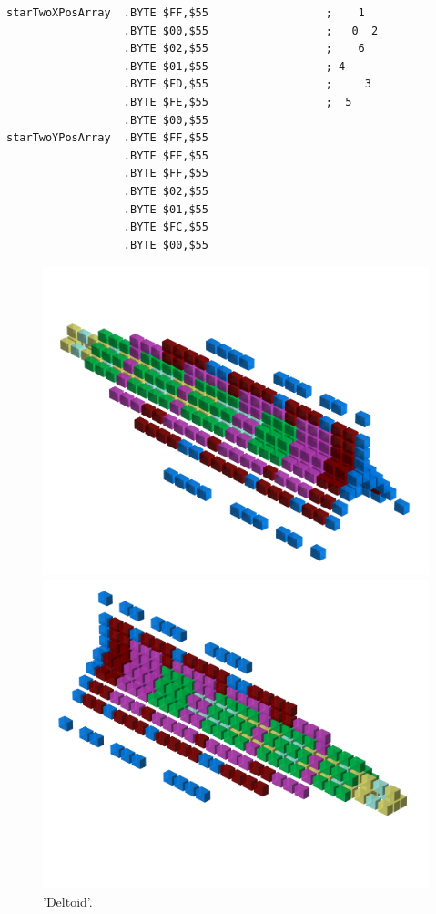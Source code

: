 \begin{lstlisting}
starTwoXPosArray  .BYTE $FF,$55                  ;    1  
                  .BYTE $00,$55                  ;   0  2
                  .BYTE $02,$55                  ;    6  
                  .BYTE $01,$55                  ; 4     
                  .BYTE $FD,$55                  ;     3 
                  .BYTE $FE,$55                  ;  5    
                  .BYTE $00,$55
starTwoYPosArray  .BYTE $FF,$55
                  .BYTE $FE,$55
                  .BYTE $FF,$55
                  .BYTE $02,$55
                  .BYTE $01,$55
                  .BYTE $FC,$55
                  .BYTE $00,$55
\end{lstlisting}

\clearpage

\begin{figure}[H]
    \centering
    \begin{adjustbox}{width=12cm,center}
      \includegraphics[width=12cm]{src/patterns/pattern4-45.png}%
    \end{adjustbox}
    \begin{adjustbox}{width=12cm,margin=0cm -4cm}
      \includegraphics[width=12cm]{src/patterns/pattern4-225.png}%
    \end{adjustbox}
\caption{'Deltoid'.}
\end{figure}
\clearpage

